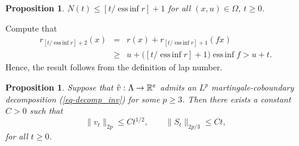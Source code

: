 \documentclass[aop,MSNbibl,seceqn,dvips]{arximspdf}
\newcommand{\eqref}[1]{(\ref{#1})}
\newtheorem{prop}[thmm]{Proposition}
\newcommand{\R}{\mathbb{R}}
\newcommand{\essinf}{\operatorname{ess\,inf}}
\newcommand{\tildev}{\tilde{v}}
\begin{document}
\begin{prop} \label{prop-lap}
$N(t)\le[t/\essinf r]+1$ for all
$(x,u)\in\Omega$, $t\ge0$.
\end{prop}

\begin{pf}
Compute that
%
\begin{eqnarray*}
r_{[t/\essinf r]+2}(x)&=&r(x)+ r_{[t/\essinf r]+1}(fx)\\
&\ge& u+\bigl([t/\essinf r]+1
\bigr)\essinf f> u+t.
\end{eqnarray*}
%
Hence, the result follows from the definition of lap number.
\end{pf}

\begin{prop} \label{prop-moment_flow}
Suppose that $\tildev\dvtx\Lambda\to\R^e$ admits an $L^p$
martingale-coboundary decomposition \eqref{eq-decomp_inv} for some
$p\ge3$.
Then there exists a constant $C>0$ such that
%
\[
\|v_t\|_{2p}\le Ct^{1/2},\qquad \|S_t
\|_{2p/3} \le Ct,
\]
%
for all $t\ge0$.
\end{prop}
\end{document}
